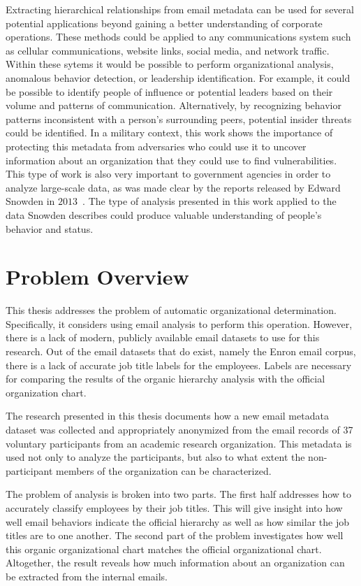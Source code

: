 \documentclass[12pt]{report}
\begin{document}
Extracting hierarchical relationships from email metadata can be used for several potential applications beyond gaining a better understanding of corporate operations.
These methods could be applied to any communications system such as cellular communications, website links, social media, and network traffic.
Within these sytems it would be possible to perform organizational analysis, anomalous behavior detection, or leadership identification.
For example, it could be possible to identify people of influence or potential leaders based on their volume and patterns of communication.
Alternatively, by recognizing behavior patterns inconsistent with a person's surrounding peers, potential insider threats could be identified.
In a military context, this work shows the importance of protecting this metadata from adversaries who could use it to uncover information about an organization that they could use to find vulnerabilities.
This type of work is also very important to government agencies in order to analyze large-scale data, as was made clear by the reports released by Edward Snowden in $2013$~\cite{snowden}.
The type of analysis presented in this work applied to the data Snowden describes could produce valuable understanding of people's behavior and status. 



\section{Problem Overview}
This thesis addresses the problem of automatic organizational determination.
Specifically, it considers using email analysis to perform this operation.
However, there is a lack of modern, publicly available email datasets to use for this research.
Out of the email datasets that do exist, namely the Enron email corpus, there is a lack of accurate job title labels for the employees.
Labels are necessary for comparing the results of the organic hierarchy analysis with the official organization chart.

The research presented in this thesis documents how a new email metadata dataset was collected and appropriately anonymized from the email records of 37 voluntary participants from an academic research organization.
This metadata is used not only to analyze the participants, but also to what extent the non-participant members of the organization can be characterized.


The problem of analysis is broken into two parts.
The first half addresses how to accurately classify employees by their job titles.
This will give insight into how well email behaviors indicate the official hierarchy as well as how similar the job titles are to one another.
The second part of the problem investigates how well this organic organizational chart matches the official organizational chart.
Altogether, the result reveals how much information about an organization can be extracted from the internal emails.
\end{document}
